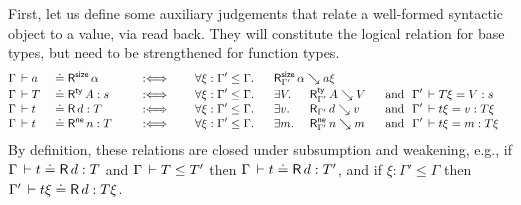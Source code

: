 \documentclass[acmsmall%
]{acmart}\settopmatter{printfolios=true}
\newcommand{\LONGVERSION}[1]{}
\begin{document}
First, let us define some auxiliary judgements that relate a
well-formed syntactic object to a value, via read back.
They will constitute the logical relation for base types,
but need to be strengthened for function types.
\begin{alignat*}{8}
& \Gamma \der a && \doteq \tRsize\, \alpha
  && \quad\defas\quad
  && \forall \xi : \Gamma' \leq \Gamma.\ \
  && \mathrlap{ \RSize {\Gamma'} \alpha {a\xi} }
\\[-0.6ex]
& \Gamma \der T && \doteq \tRty\, A  : s
  && \quad\defas\quad
  && \forall \xi : \Gamma' \leq \Gamma.\ \
  && \exists V.\
  && \RTy{\Gamma'} A V
  && ~\mand~ \Gamma' \der T\xi = V : s
\\[-0.6ex]
& \Gamma \der t && \doteq \tR\, d  : T
  && \quad\defas\quad
  && \forall \xi : \Gamma' \leq \Gamma.\ \
  && \exists v.\
  && \R{\Gamma'} d v
  && ~\mand~ \Gamma' \der t\xi = v : T\xi
\\[-0.6ex]
& \Gamma \der t && \doteq \tRne\, n  : T
  && \quad\defas\quad
  && \forall \xi : \Gamma' \leq \Gamma.\ \
  && \exists m.\
  && \RNe{\Gamma'} n m
  && ~\mand~ \Gamma' \der t\xi = m : T\xi
\end{alignat*}
By definition, these relations are closed under subsumption and
weakening, e.g., if\/ $\Gamma \,\vdash t \doteq \mathsf{R}\, d : T$ and $\Gamma \,\vdash T \leq T'$ then $\Gamma \,\vdash t \doteq \mathsf{R}\, d : T'$,
and if\/ $\xi : \Gamma' \leq \Gamma$ then $\Gamma' \,\vdash t\xi \doteq \mathsf{R}\, d : T\xi$.
\LONGVERSION{
\begin{lemma}[Fresh variable readback]
  \label{lem:freshread}
  If\/ $\Gamma \der U$ then $\RNE{\cext \Gamma U} {\ind 0} {\var \Gamma} {U \slift}$.
\end{lemma}
\begin{proof}
  Assume $\xi : \Gamma' \leq \cext \Gamma U$.
  Note that $\RNe{\Gamma'} {\var\Gamma} {\ind i}$ where
  $i = |\Gamma'| - |\cext \Gamma U|$ is the length of the context extension.
  Since $\ind 0 \xi = \ind i$, we conclude
  $\Gamma' \der \ind 0 \xi = \ind i : U \slift \xi$
  by weakening of the judgement $\cext \Gamma U \der \ind 0 = \ind 0 : U \slift$.
\end{proof}
} %
\end{document}
